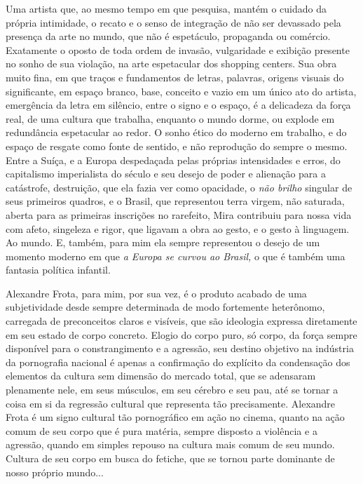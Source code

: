 Uma artista que, ao mesmo tempo em que pesquisa, mantém o cuidado da
própria intimidade, o recato e o senso de integração de não ser
devassado pela presença da arte no mundo, que não é espetáculo,
propaganda ou comércio. Exatamente o oposto de toda ordem de invasão,
vulgaridade e exibição presente no sonho de sua violação, na arte
espetacular dos shopping centers. Sua obra muito fina, em que traços e
fundamentos de letras, palavras, origens visuais do significante, em
espaço branco, base, conceito e vazio em um único ato do artista,
emergência da letra em silêncio, entre o signo e o espaço, é a
delicadeza da força real, de uma cultura que trabalha, enquanto o mundo
dorme, ou explode em redundância espetacular ao redor. O sonho ético do
moderno em trabalho, e do espaço de resgate como fonte de sentido, e não
reprodução do sempre o mesmo. Entre a Suíça, e a Europa despedaçada
pelas próprias intensidades e erros, do capitalismo imperialista do
século  e seu desejo de poder e alienação para a catástrofe,
destruição, que ela fazia ver como opacidade, o \emph{não brilho}
singular de seus primeiros quadros, e o Brasil, que representou terra
virgem, não saturada, aberta para as primeiras inscrições no rarefeito,
Mira contribuiu para nossa vida com afeto, singeleza e rigor, que
ligavam a obra ao gesto, e o gesto à linguagem. Ao mundo. E, também,
para mim ela sempre representou o desejo de um momento moderno em que
\emph{a Europa se curvou ao Brasil,} o que é também uma fantasia
política infantil.

Alexandre Frota, para mim, por sua vez, é o produto acabado de uma
subjetividade desde sempre determinada de modo fortemente heterônomo,
carregada de preconceitos claros e visíveis, que são ideologia expressa
diretamente em seu estado de corpo concreto. Elogio do corpo puro, só
corpo, da força sempre disponível para o constrangimento e a agressão,
seu destino objetivo na indústria da pornografia nacional é apenas a
confirmação do explícito da condensação dos elementos da cultura sem
dimensão do mercado total, que se adensaram plenamente nele, em seus
músculos, em seu cérebro e seu pau, até se tornar a coisa em si da
regressão cultural que representa tão precisamente. Alexandre Frota é um
signo cultural tão pornográfico em ação no cinema, quanto na ação comum
de seu corpo que é pura matéria, sempre disposto a violência e a
agressão, quando em simples repouso na cultura mais comum de seu mundo.
Cultura de seu corpo em busca do fetiche, que se tornou parte dominante
de nosso próprio mundo...


